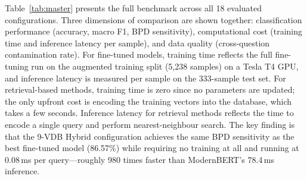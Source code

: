 \documentclass[11pt]{article}
\begin{document}
Table~\ref{tab:master} presents the full benchmark across all 18 evaluated configurations. Three
dimensions of comparison are shown together: classification performance (accuracy, macro F1, BPD
sensitivity), computational cost (training time and inference latency per sample), and data
quality (cross-question contamination rate). For fine-tuned models, training time reflects the
full fine-tuning run on the augmented training split (5,238 samples) on a Tesla T4 GPU, and
inference latency is measured per sample on the 333-sample test set. For retrieval-based methods,
training time is zero since no parameters are updated; the only upfront cost is encoding the
training vectors into the database, which takes a few seconds. Inference latency for retrieval
methods reflects the time to encode a single query and perform nearest-neighbour search. The key
finding is that the 9-VDB Hybrid configuration achieves the same BPD sensitivity as the best
fine-tuned model (86.57\%) while requiring no training at all and running at 0.08\,ms per
query---roughly 980 times faster than ModernBERT's 78.4\,ms inference.
\end{document}
